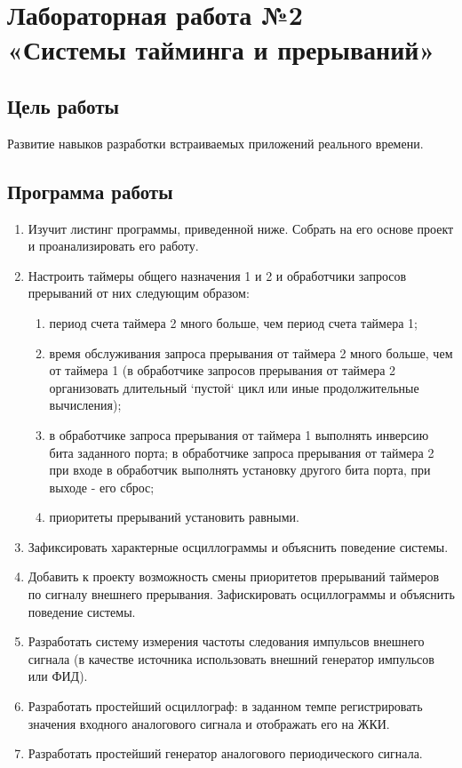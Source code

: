 \documentclass[14pt,a4paper,report]{report}
\begin{document}
\clearpage

\chapter {Лабораторная работа №2 \\«Системы тайминга и прерываний»}

\section {Цель работы}

Развитие навыков разработки встраиваемых приложений реального времени. 

\section{Программа работы}

\begin{enumerate}
	\item Изучит листинг программы, приведенной ниже. Собрать на его основе проект и проанализировать его работу.
	\item Настроить таймеры общего назначения 1 и 2 и обработчики запросов прерываний от них следующим образом:
	\begin{enumerate}
		\item период счета таймера 2 много больше, чем период счета таймера 1;
		\item время обслуживания запроса прерывания от таймера 2 много больше, чем от таймера 1 (в обработчике запросов прерывания от таймера 2 организовать длительный `пустой` цикл или иные продолжительные вычисления);
		\item в обработчике запроса прерывания от таймера 1 выполнять инверсию бита заданного порта; в обработчике запроса прерывания от таймера 2 при входе в обработчик выполнять установку другого бита порта, при выходе - его сброс;
		\item приоритеты прерываний установить равными.
	\end{enumerate}
	\item Зафиксировать характерные осциллограммы и объяснить поведение системы.
	\item Добавить к проекту возможность смены приоритетов прерываний таймеров по сигналу внешнего прерывания. Зафискировать осциллограммы и объяснить поведение системы.
	\item Разработать систему измерения частоты следования импульсов внешнего сигнала (в качестве источника использовать внешний генератор импульсов или ФИД).
	\item Разработать простейший осциллограф: в заданном темпе регистрировать значения входного аналогового сигнала и отображать его на ЖКИ.
	\item Разработать простейший генератор аналогового периодического сигнала.
\end{enumerate}
\end{document}
